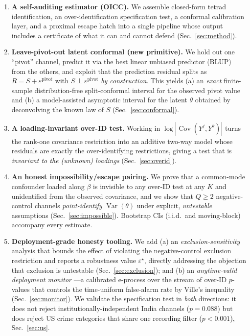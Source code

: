 \documentclass[11pt]{article}
\theoremstyle{definition}
\theoremstyle{remark}
\newcommand{\Var}{\operatorname{Var}}
\newcommand{\Cov}{\operatorname{Cov}}
\newcommand{\eps}{\varepsilon}
\begin{document}
\begin{enumerate}[leftmargin=1.6em,itemsep=2pt]
\item \textbf{A self-auditing estimator (OICC).} We assemble closed-form
tetrad identification, an over-identification specification test, a
conformal calibration layer, and a proximal escape hatch into a single
pipeline whose output includes a certificate of what it can and cannot
defend (Sec.~\ref{sec:method}).
\item \textbf{Leave-pivot-out latent conformal (new primitive).} We hold out
one ``pivot'' channel, predict it via the best linear unbiased predictor
(BLUP) from the others, and exploit that the prediction residual splits as
$R = S + \eps^{\text{pivot}}$ with $S \perp \eps^{\text{pivot}}$
\emph{by construction}. This yields (a) an \emph{exact} finite-sample
distribution-free split-conformal interval for the observed pivot value and
(b) a model-assisted asymptotic interval for the latent $\theta$ obtained by
deconvolving the known law of $S$ (Sec.~\ref{sec:conformal}).
\item \textbf{A loading-invariant over-ID test.} Working in
$\log|\Cov(Y^j,Y^k)|$ turns the rank-one covariance restriction into an
additive two-way model whose residuals are exactly the over-identifying
restrictions, giving a test that is \emph{invariant to the (unknown)
loadings} (Sec.~\ref{sec:overid}).
\item \textbf{An honest impossibility/escape pairing.} We prove that a
common-mode confounder loaded along $\beta$ is invisible to any over-ID test
at any $K$ and unidentified from the observed covariance, and we show that
$Q\ge 2$ negative-control channels \emph{point-identify} $\Var(\theta)$ under
explicit, \emph{untestable} assumptions (Sec.~\ref{sec:impossible}). Bootstrap
CIs (i.i.d.\ and moving-block) accompany every estimate.
\item \textbf{Deployment-grade honesty tooling.} We add (a) an
\emph{exclusion-sensitivity} analysis that bounds the effect of violating the
negative-control exclusion restriction and reports a robustness value
$\eps^\star$, directly addressing the objection that exclusion is untestable
(Sec.~\ref{sec:exclusion}); and (b) an \emph{anytime-valid deployment monitor}
---a calibrated e-process over the stream of over-ID $p$-values that controls
the time-uniform false-alarm rate by Ville's inequality
(Sec.~\ref{sec:monitor}). We validate the specification test in
\emph{both} directions: it does not reject institutionally-independent India
channels ($p{=}0.088$) but does reject US crime categories that share one
recording filter ($p<0.001$), Sec.~\ref{sec:us}.
\end{enumerate}
\end{document}

